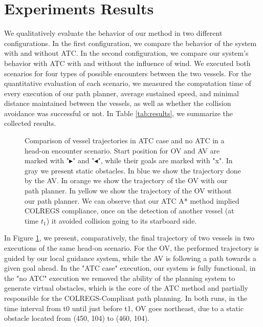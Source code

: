     \section{Experiments Results}

        We qualitatively evaluate the behavior of our method in two different configurations. In the first configuration, we compare the behavior of the system with and without \ac{ATC}.  In the second configuration, we compare our system's behavior with \ac{ATC} with and without the influence of wind. We executed both scenarios for four types of possible encounters between the two vessels. For the quantitative evaluation of each scenario, we measured the computation time of every execution of our path planner, average sustained speed, and minimal distance maintained between the vessels, as well as whether the collision avoidance was successful or not. In Table \ref{tab:results}, we summarize the collected results.

        
        \begin{figure}[H]
            \centering
            
            \caption{Comparison of vessel trajectories in \ac{ATC} case and no \ac{ATC} in a head-on encounter scenario. Start position for \ac{OV} and \ac{AV} are marked with "$\blacktriangleright$" and "$\blacktriangleleft$", while their goals are marked with "x". In gray we present static obstacles. In blue we show the trajectory done by the \ac{AV}. In orange we show the trajectory of the \ac{OV} with our path planner. In yellow we show the trajectory of the \ac{OV} without our path planner. We can observe that our \ac{ATC} A* method implied \ac{COLREGS} compliance, once on the detection of another vessel (at time $t_1$) it avoided collision going to its starboard side.}
            \label{fig:plot_ho_w_vs_wo}
        \end{figure}
        
        In Figure \ref{fig:plot_ho_w_vs_wo}, we present, comparatively, the final trajectory of two vessels in two executions of the same head-on scenario. For the \ac{OV}, the performed trajectory is guided by our local guidance system, while the \ac{AV} is following a path towards a given goal ahead. In the "ATC case" execution, our system is fully functional, in the "no ATC" execution we removed the ability of the planning system to generate virtual obstacles, which is the core of the \ac{ATC} method and partially responsible for the \ac{COLREGS}-Compliant path planning. In both runs, in the time interval from t0 until just before t1, \ac{OV} goes northeast, due to a static obstacle located from (450, 104) to (460, 104). 
        
